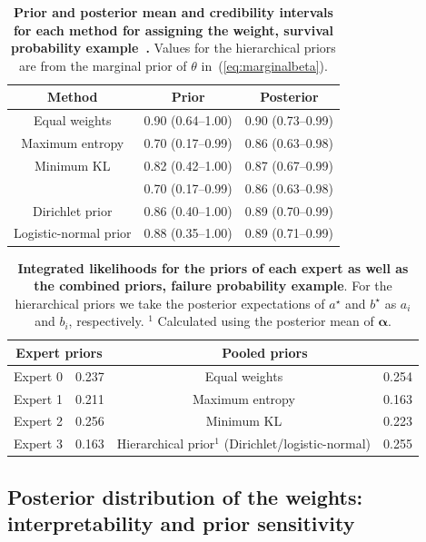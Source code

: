 \documentclass[a4paper, notitlepage, 10pt]{article}
\begin{document}
\begin{table}[ht]
\caption{\textbf{Prior and posterior mean and credibility intervals for each method for assigning the weight, survival probability example~\citep{savchuk1994}.}
Values for the hierarchical priors are from the marginal prior of $\theta$ in~(\ref{eq:marginalbeta}).
}
\centering
\begin{tabular}{ccc}
 \hline
Method & Prior & Posterior  \\ 
 \hline
 Equal weights & 0.90 (0.64--1.00) & 0.90 (0.73--0.99) \\ 
 Maximum entropy &  0.70 (0.17--0.99) & 0.86 (0.63--0.98) \\ 
 Minimum KL  &  0.82 (0.42--1.00) & 0.87 (0.67--0.99) \\ 
 \cite{rufo2012B} & 0.70 (0.17--0.99) & 0.86 (0.63--0.98)\\
 Dirichlet prior & 0.86 (0.40--1.00) & 0.89 (0.70--0.99) \\ 
 Logistic-normal prior & 0.88 (0.35--1.00) & 0.89 (0.71--0.99) \\ 
  \hline
\end{tabular}
\label{tab:prior_posteriorsSavchuk}
\end{table}


\begin{table}[ht]
\caption{\textbf{Integrated likelihoods for the priors of each expert as well as the combined priors, failure probability example}.
For the hierarchical priors we take the posterior expectations of $a^\star$ and $b^\star$ as $a_i$ and $b_i$, respectively.
$^1$ Calculated using the posterior mean of $\boldsymbol\alpha$. }
\centering
\begin{tabular}{cccc}
   \hline
   \multicolumn{2}{c}{Expert priors} &  \multicolumn{2}{c}{Pooled priors} \\
   \hline
   Expert 0 & 0.237 & Equal weights & 0.254\\
   Expert 1 & 0.211 & Maximum entropy & 0.163 \\
   Expert 2 & 0.256 & Minimum KL & 0.223 \\ 
   Expert 3 & 0.163 & Hierarchical prior$^1$ (Dirichlet/logistic-normal) & 0.255 \\
   \hline
\end{tabular}
\label{tab:marglikes}
\end{table}

\subsection{Posterior distribution of the weights: interpretability and prior sensitivity}
\label{sec:learning_rate}
\end{document}
